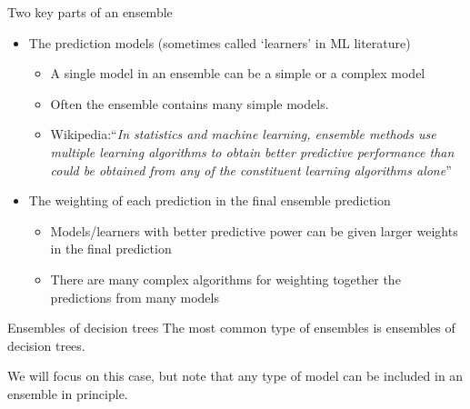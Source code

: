 \documentclass[11pt,aspectratio=1610,usenames,dvipsnames]{beamer} %
\begin{document}
%

\begin{frame}{Two key parts of an ensemble}
	\begin{itemize}
		\item The prediction models (sometimes called `learners' in ML literature)
		\begin{itemize}
			\item A single model in an ensemble can be a simple or a complex model
			\item Often the ensemble contains many simple models.
			\item Wikipedia:``\textit{In statistics and machine learning, ensemble methods use multiple learning algorithms to obtain better predictive performance than could be obtained from any of the constituent learning algorithms alone}''
		\end{itemize}
		\item The weighting of each prediction in the final ensemble prediction
		\begin{itemize}
			\item Models/learners with better predictive power can be given larger weights in the final prediction
			\item There are many complex algorithms for weighting together the predictions from many models
		\end{itemize}
	\end{itemize}
\end{frame}


\begin{frame}{Ensembles of decision trees}
	The most common type of ensembles is ensembles of decision trees.
	
	We will focus on this case, but note that any type of model can be included in an ensemble in principle.
\end{frame}
\end{document}

